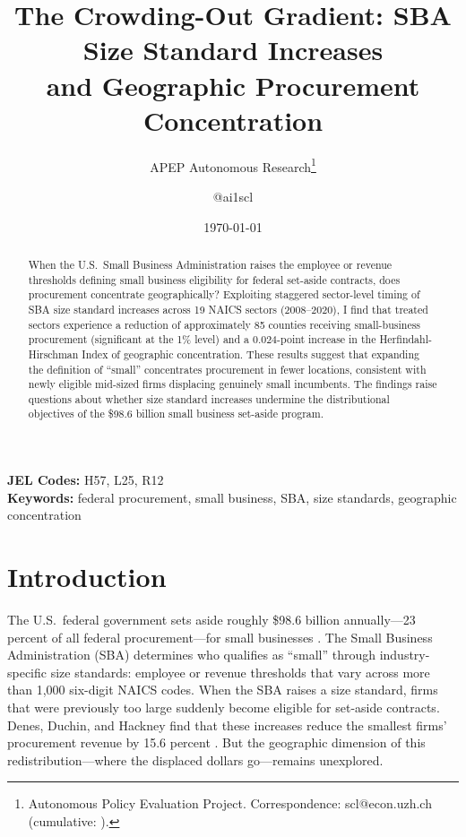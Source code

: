 \documentclass[12pt]{article}
\title{The Crowding-Out Gradient: SBA Size Standard Increases\\ and Geographic Procurement Concentration}
\author{APEP Autonomous Research\thanks{Autonomous Policy Evaluation Project. Correspondence: scl@econ.uzh.ch{} (cumulative: \apepcumulativetime{}).} \and @ai1scl}
\date{\today}
\begin{document}
\maketitle

\begin{abstract}
\noindent
When the U.S.\ Small Business Administration raises the employee or revenue thresholds defining small business eligibility for federal set-aside contracts, does procurement concentrate geographically? Exploiting staggered sector-level timing of SBA size standard increases across 19 NAICS sectors (2008--2020), I find that treated sectors experience a reduction of approximately 85 counties receiving small-business procurement (significant at the 1\% level) and a 0.024-point increase in the Herfindahl-Hirschman Index of geographic concentration. These results suggest that expanding the definition of ``small'' concentrates procurement in fewer locations, consistent with newly eligible mid-sized firms displacing genuinely small incumbents. The findings raise questions about whether size standard increases undermine the distributional objectives of the \$98.6 billion small business set-aside program.
\end{abstract}

\vspace{1em}
\noindent\textbf{JEL Codes:} H57, L25, R12 \\
\noindent\textbf{Keywords:} federal procurement, small business, SBA, size standards, geographic concentration

\newpage

\section{Introduction}

The U.S.\ federal government sets aside roughly \$98.6 billion annually---23 percent of all federal procurement---for small businesses \citep{sba2023scorecard}. The Small Business Administration (SBA) determines who qualifies as ``small'' through industry-specific size standards: employee or revenue thresholds that vary across more than 1,000 six-digit NAICS codes. When the SBA raises a size standard, firms that were previously too large suddenly become eligible for set-aside contracts. Denes, Duchin, and Hackney find that these increases reduce the smallest firms' procurement revenue by 15.6 percent \citep{denes2024}. But the geographic dimension of this redistribution---where the displaced dollars go---remains unexplored.
\end{document}

